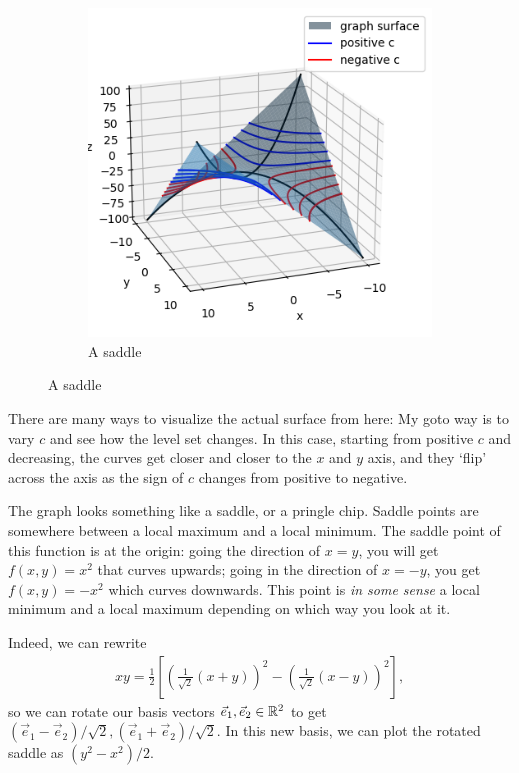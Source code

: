 \begin{figure}[h]
\begin{subfigure}{0.4\textwidth}
        \includegraphics[width=\textwidth]{Rn_function/saddle.png}
        \caption{A saddle}
    \end{subfigure}
\end{figure}


 There are many ways to visualize the actual surface from here: My goto way is to vary $c$ and see how the level set changes. In this case, starting from positive $c$ and decreasing, the curves get closer and closer to the $x$ and $y$ axis, and they `flip' across the axis as the sign of $c$ changes from positive to negative.

The graph looks something like a saddle, or a pringle chip. Saddle points are somewhere between a local maximum and a local minimum. The saddle point of this function is at the origin: going the direction of $x=y$, you will get $f(x,y)=x^2$ that curves upwards; going in the direction of $x=-y$, you get $f(x,y)=-x^2$ which curves downwards. This point is \textit{in some sense} a local minimum and a local maximum depending on which way you look at it.

Indeed, we can rewrite \begin{align*}
    xy = \frac{1}{2}\left[\left(\frac{1}{\sqrt{2}}(x+y)\right)^2 - \left(\frac{1}{\sqrt{2}}(x-y)\right)^2\right],
\end{align*}
so we can rotate our basis vectors $\vec{e}_1,\vec{e}_2\in \mathbb{R}^2$ to get $(\vec{e}_1-\vec{e}_2)/\sqrt{2},(\vec{e}_1+\vec{e}_2)/\sqrt{2}$. In this new basis, we can plot the rotated saddle as $(y^2 -x^2)/2$.

